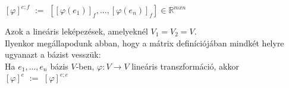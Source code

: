 \begin{frame}
\begin{tcolorbox}[title={Def.: Vektortérhomomorfizmus mátrixa}]
			$[{\varphi}]^{e;f}$ $:=$ $[[{\varphi}(e_1)]_f, ..., [{\varphi}(e_n)]_f] \in \mathbb{R}^{m x n}$
		\end{tcolorbox}	
	
		\begin{tcolorbox}[title={Def.: Lineáris tranzformáció}]
 			Azok a lineáris leképezések, amelyeknél $V_1 = V_2 = V$.\\
 			
 			Ilyenkor megállapodunk abban, hogy a mátrix definíciójában mindkét helyre ugyanazt a bázist vesszük:\\
 			Ha $e_1, ..., e_n$ bázis $V$-ben, $\varphi : V \rightarrow V$ lineáris transzformáció, akkor\\
 			$[\varphi]^e$ $:=$ $[\varphi]^{e;e}$
		\end{tcolorbox}	
	\end{frame}
	
